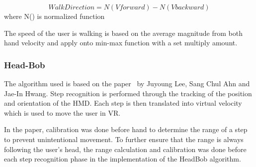 \documentclass[manuscript,review,anonymous]{acmart}
\begin{document}
\[ \displaystyle WalkDirection = N(Vforward) - N(Vbackward)\]
where N() is normalized function

The speed of the user is walking is based on the average magnitude from both hand velocity and apply onto min-max function with a set multiply amount.


\subsubsection{Head-Bob}
The algorithm used is based on the paper~\cite{headBob2018} by Juyoung Lee, Sang Chul Ahn and Jae-In Hwang. Step recognition is performed through the tracking of the position and orientation of the HMD. Each step is then translated into virtual velocity which is used to move the user in VR.

In the paper, calibration was done before hand to determine the range of a step to prevent unintentional movement. To further ensure that the range is always following the user's head, the range calculation and calibration was done before each step recognition phase in the implementation of the HeadBob algorithm.






\end{document}

